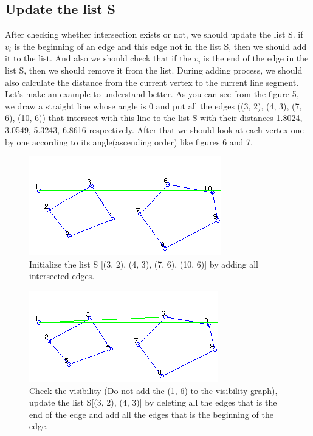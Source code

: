 \documentclass{article}
\begin{document}
\subsection{Update the list S}

After checking whether intersection exists or not, we should update the list S. if $v_{i}$ is the beginning of an edge and this edge not in the list S, then we should add it to the list. And also we should check that if the $v_{i}$ is the end of the edge in the list S, then we should remove it from the list. During adding process, we should also calculate the distance from the current vertex to the current line segment.
\\

Let's make an example to understand better. As you can see from the figure 5, we draw a straight line whose angle is 0 and put all the edges ((3, 2), (4, 3), (7, 6), (10, 6)) that intersect with this line to the list S with their distances 1.8024, 3.0549, 5.3243, 6.8616 respectively. After that we should look at each vertex one by one according to its angle(ascending order) like figures 6 and 7.

\begin{figure}[!h]
\begin{center}
\includegraphics[scale=1.0]{02}
\caption{Initialize the list S [(3, 2), (4, 3), (7, 6), (10, 6)] by adding all intersected edges.}
\end{center}
\end{figure}

\begin{figure}[!h]
\begin{center}
\includegraphics[scale=1.0]{03}
\caption{Check the visibility (Do not add the (1, 6) to the visibility graph), update the list S[(3, 2), (4, 3)] by deleting all the edges that is the end of the edge and add all the edges that is the beginning of the edge.}
\end{center}
\end{figure}
\end{document}
